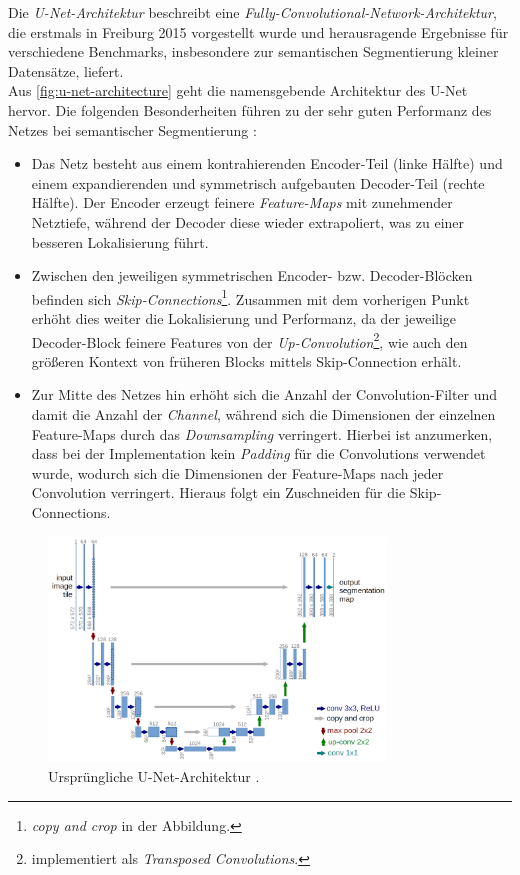 Die \textit{U-Net-Architektur} beschreibt eine \textit{Fully-Convolutional-Network-Architektur}, die erstmals in Freiburg 2015 vorgestellt wurde 
und herausragende Ergebnisse für verschiedene Benchmarks, insbesondere zur semantischen Segmentierung kleiner Datensätze, liefert. \\
Aus \autoref{fig:u-net-architecture} geht die namensgebende Architektur des U-Net hervor. Die folgenden Besonderheiten 
führen zu der sehr guten Performanz des Netzes bei semantischer Segmentierung \cite{Ronneberger.18052015}:
\begin{itemize}
	\item Das Netz besteht aus einem kontrahierenden Encoder-Teil (linke Hälfte) und einem expandierenden und symmetrisch aufgebauten
	Decoder-Teil (rechte Hälfte). Der Encoder erzeugt feinere \textit{Feature-Maps} mit zunehmender Netztiefe, 
	während der Decoder diese wieder extrapoliert, was zu einer besseren Lokalisierung führt. 
	\item Zwischen den jeweiligen symmetrischen Encoder- bzw. Decoder-Blöcken befinden sich \textit{Skip-Connections}\footnote{\textit{copy and crop} in der Abbildung.}.
	Zusammen mit dem vorherigen Punkt erhöht dies weiter die Lokalisierung und Performanz, da der jeweilige Decoder-Block feinere Features von der \textit{Up-Convolution}\footnote{implementiert als \textit{Transposed Convolutions}.},
	wie auch den größeren Kontext von früheren Blocks mittels Skip-Connection erhält. 
	\item Zur Mitte des Netzes hin erhöht sich die Anzahl der Convolution-Filter und damit die Anzahl der \textit{Channel}, 
	während sich die Dimensionen der einzelnen Feature-Maps durch das \textit{Downsampling} verringert. 
	Hierbei ist anzumerken, dass bei der Implementation kein \textit{Padding} für die Convolutions verwendet wurde,
	wodurch sich die Dimensionen der Feature-Maps nach jeder Convolution verringert. 
	Hieraus folgt ein Zuschneiden für die Skip-Connections. 
\end{itemize}

\begin{figure}
	\centering
	\includegraphics[width=0.8\textwidth]{Bilder/u-net-architecture.png} 
	\caption{Ursprüngliche U-Net-Architektur \cite{Ronneberger.18052015}.}
	\label{fig:u-net-architecture}
\end{figure} 

